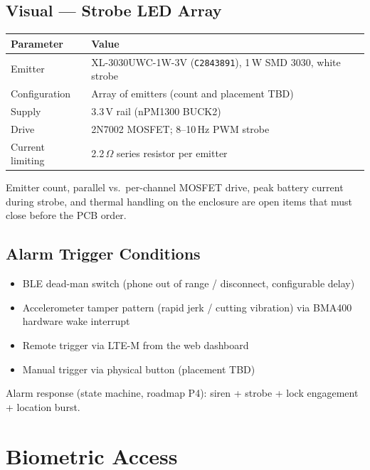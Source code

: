\documentclass[11pt,a4paper]{article}
\newcommand{\partno}[1]{\texttt{#1}}
\begin{document}
\subsection{Visual --- Strobe LED Array}

\begin{table}[h]
\small
\begin{tabularx}{\textwidth}{lL}
\toprule
\textbf{Parameter} & \textbf{Value}\\
\midrule
Emitter & XL-3030UWC-1W-3V (\partno{C2843891}), 1\,W SMD 3030, white strobe\\
Configuration & Array of emitters (count and placement TBD)\\
Supply & 3.3\,V rail (nPM1300 BUCK2)\\
Drive & 2N7002 MOSFET; 8--10\,Hz PWM strobe\\
Current limiting & 2.2\,$\Omega$ series resistor per emitter\\
\bottomrule
\end{tabularx}
\end{table}

Emitter count, parallel vs.\ per-channel MOSFET drive, peak battery current during strobe, and thermal handling on the enclosure are open items that must close before the PCB order.

\subsection{Alarm Trigger Conditions}

\begin{itemize}
  \item BLE dead-man switch (phone out of range / disconnect, configurable delay)
  \item Accelerometer tamper pattern (rapid jerk / cutting vibration) via BMA400 hardware wake interrupt
  \item Remote trigger via LTE-M from the web dashboard
  \item Manual trigger via physical button (placement TBD)
\end{itemize}

Alarm response (state machine, roadmap P4): siren + strobe + lock engagement + location burst.

\section{Biometric Access}
\end{document}
